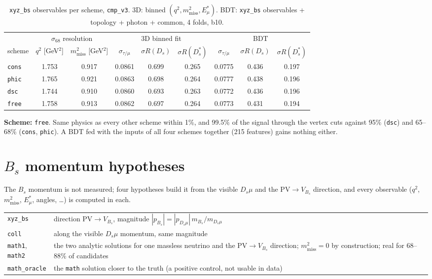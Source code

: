 \documentclass[10pt,a4paper]{article}
\newcommand{\code}[1]{\texttt{#1}}
\newcommand{\Ds}{D_s}
\newcommand{\Dss}{D_s^*}
\newcommand{\mm}{m^2_\text{miss}}
\newcommand{\Es}{E^*_\mu}
\newcommand{\sR}{\sigma R}
\newcommand{\finding}[1]{\par\smallskip\noindent\colorbox{blue!6}{\parbox{\dimexpr\linewidth-2\fboxsep}{#1}}\par\smallskip}
\begin{document}
\begin{table}[H]
\centering\small
\caption{\code{xyz\_bs} observables per scheme, \code{cmp\_v3}. 3D: binned $(q^2,\mm,\Es)$. BDT: \code{xyz\_bs}
observables + topology + photon + common, 4 folds, b10.}
\begin{tabular}{lcc|ccc|ccc}
\toprule
 & \multicolumn{2}{c|}{$\sigma_{68}$ resolution} & \multicolumn{3}{c|}{3D binned fit} & \multicolumn{3}{c}{BDT} \\
scheme & $q^2$ [GeV$^2$] & $\mm$ [GeV$^2$] & $\sigma_{\tau/\mu}$ & $\sR(\Ds)$ & $\sR(\Dss)$ & $\sigma_{\tau/\mu}$ & $\sR(\Ds)$ & $\sR(\Dss)$ \\
\midrule
\code{cons} & 1.753 & 0.917 & 0.0861 & 0.699 & 0.265 & 0.0775 & 0.436 & 0.197 \\
\code{phic} & 1.765 & 0.921 & 0.0863 & 0.698 & 0.264 & 0.0777 & 0.438 & 0.196 \\
\code{dsc}  & 1.744 & 0.910 & 0.0860 & 0.693 & 0.263 & 0.0772 & 0.436 & 0.196 \\
\code{free} & 1.758 & 0.913 & 0.0862 & 0.697 & 0.264 & 0.0773 & 0.431 & 0.194 \\
\bottomrule
\end{tabular}
\end{table}

\finding{\textbf{Scheme:} \code{free}. Same physics as every other scheme within 1\%, and 99.5\% of the signal
through the vertex cuts against 95\% (\code{dsc}) and 65--68\% (\code{cons}, \code{phic}). A BDT fed with the inputs of
all four schemes together (215 features) gains nothing either.}

\section{$B_s$ momentum hypotheses}
\label{sec:hyp}

The $B_s$ momentum is not measured; four hypotheses build it from the visible $\Ds\mu$ and the PV$\to V_{B_s}$
direction, and every observable ($q^2$, $\mm$, $\Es$, angles, \dots) is computed in each.

\begin{center}
\small
\begin{tabular}{l>{\raggedright\arraybackslash}p{}}
\toprule
\code{xyz\_bs} & direction PV$\to V_{B_s}$, magnitude $|p_{B_s}|=|p_{\Ds\mu}|\,m_{B_s}/m_{\Ds\mu}$ \\
\code{coll} & along the visible $\Ds\mu$ momentum, same magnitude \\
\code{math1}, \code{math2} & the two analytic solutions for one massless neutrino and the PV$\to V_{B_s}$ direction;
  $\mm=0$ by construction; real for 68--88\% of candidates \\
\code{math\_oracle} & the \code{math} solution closer to the truth (a positive control, not usable in data) \\
\bottomrule
\end{tabular}
\end{center}
\end{document}
